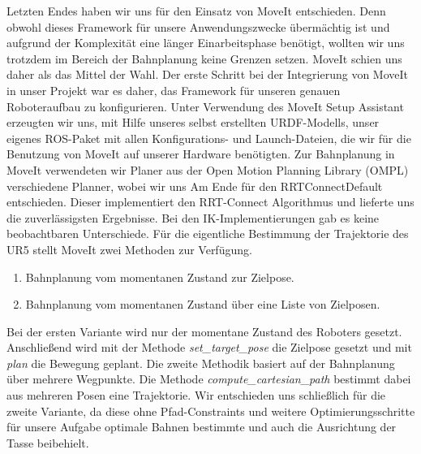 \newline
Letzten Endes haben wir uns für den Einsatz von MoveIt entschieden. Denn obwohl dieses Framework für unsere Anwendungszwecke übermächtig ist und aufgrund der Komplexität eine länger Einarbeitsphase benötigt, wollten wir uns trotzdem im Bereich der Bahnplanung keine Grenzen setzen. MoveIt schien uns daher als das Mittel der Wahl.
\newline
Der erste Schritt bei der Integrierung von MoveIt in unser Projekt war es daher, das Framework für unseren genauen Roboteraufbau zu konfigurieren. Unter Verwendung des MoveIt Setup Assistant \cite{MoveItAssistant} erzeugten wir uns, mit Hilfe unseres selbst erstellten URDF-Modells, unser eigenes ROS-Paket mit allen Konfigurations- und Launch-Dateien, die wir für die Benutzung von MoveIt auf unserer Hardware benötigten.
\newline
Zur Bahnplanung in MoveIt verwendeten wir Planer aus der Open Motion Planning Library (OMPL) verschiedene Planner, wobei wir uns Am Ende für den RRTConnectDefault entschieden. Dieser implementiert den RRT-Connect Algorithmus und lieferte uns die zuverlässigsten Ergebnisse. Bei den IK-Implementierungen gab es keine beobachtbaren Unterschiede.
\newline
Für die eigentliche Bestimmung der Trajektorie des UR5 stellt MoveIt zwei Methoden zur Verfügung.
\begin{enumerate}
	\item Bahnplanung vom momentanen Zustand zur Zielpose.
	\item Bahnplanung vom momentanen Zustand über eine Liste von Zielposen.
\end{enumerate}
Bei der ersten Variante wird nur der momentane Zustand des Roboters gesetzt. Anschließend wird mit der Methode \textit{set\_target\_pose} die Zielpose gesetzt und mit \textit{plan} die Bewegung geplant. Die zweite Methodik basiert auf der Bahnplanung über mehrere Wegpunkte. Die Methode \textit{compute\_cartesian\_path} bestimmt dabei aus mehreren Posen eine Trajektorie. Wir entschieden uns schließlich für die zweite Variante, da diese ohne Pfad-Constraints und weitere Optimierungsschritte für unsere Aufgabe optimale Bahnen bestimmte und auch die Ausrichtung der Tasse beibehielt.
